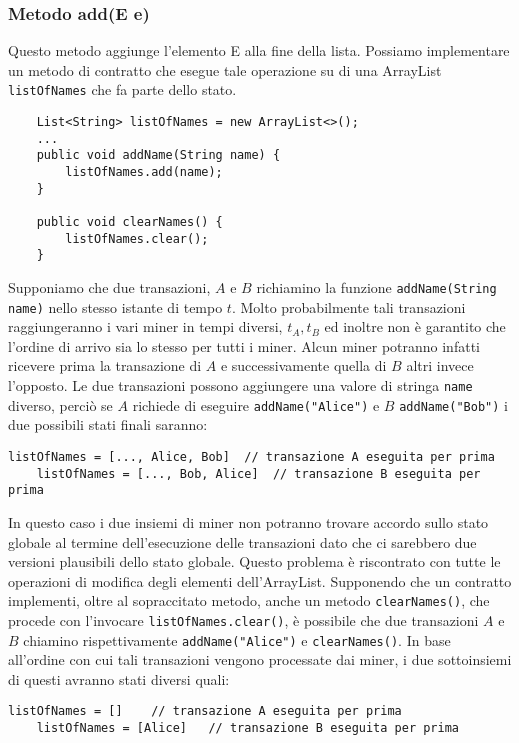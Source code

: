 			\subsubsection{Metodo add(E e)}
				Questo metodo aggiunge l'elemento E alla fine della lista. Possiamo implementare un metodo di contratto che esegue tale operazione su di una ArrayList \lstinline|listOfNames| che fa parte dello stato.
				\begin{lstlisting}
	List<String> listOfNames = new ArrayList<>();
	...
	public void addName(String name) {
		listOfNames.add(name);
	}
	
	public void clearNames() {
		listOfNames.clear();
	}
				\end{lstlisting}
				Supponiamo che due transazioni, $A$ e $B$ richiamino la funzione \lstinline|addName(String name)| nello stesso istante di tempo $t$. Molto probabilmente tali transazioni raggiungeranno i vari miner in tempi diversi, $t_A, t_B$ ed inoltre non è garantito che l'ordine di arrivo sia lo stesso per tutti i miner. Alcun miner potranno infatti ricevere prima la transazione di $A$ e successivamente quella di $B$ altri invece l'opposto. Le due transazioni possono aggiungere una valore di stringa \lstinline|name| diverso, perciò se $A$ richiede di eseguire \lstinline|addName("Alice")| e $B$ \lstinline|addName("Bob")| i due possibili stati finali saranno:
				\begin{lstlisting}[numbers=none,frame=none]
	listOfNames = [..., Alice, Bob]  // transazione A eseguita per prima
	listOfNames = [..., Bob, Alice]  // transazione B eseguita per prima
				\end{lstlisting}
				In questo caso i due insiemi di miner non potranno trovare accordo sullo stato globale al termine dell'esecuzione delle transazioni dato che ci sarebbero due versioni plausibili dello stato globale.
				Questo problema è riscontrato con tutte le operazioni di modifica degli elementi dell'ArrayList. Supponendo che un contratto implementi, oltre al sopraccitato metodo, anche un metodo \lstinline|clearNames()|, che procede con l'invocare \lstinline|listOfNames.clear()|, è possibile che due transazioni $A$ e $B$ chiamino rispettivamente \lstinline|addName("Alice")| e \lstinline|clearNames()|. In base all'ordine con cui tali transazioni vengono processate dai miner, i due sottoinsiemi di questi avranno stati diversi quali:
				\begin{lstlisting}[numbers=none,frame=none]
	listOfNames = []	// transazione A eseguita per prima
	listOfNames = [Alice]	// transazione B eseguita per prima
				\end{lstlisting}
